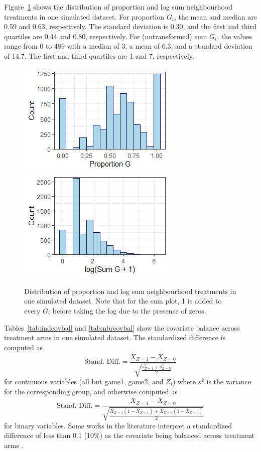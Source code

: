 \documentclass[10pt]{article}
\begin{document}
Figure~\ref{fig:neighbourhood} shows the distribution of proportion and log sum neighbourhood treatments in one simulated dataset. For proportion $G_i$, the mean and median are 0.59 and 0.63, respectively. The standard deviation is 0.30, and the first and third quartiles are 0.44 and 0.80, respectively. For (untransformed) sum $G_i$, the values range from 0 to 489 with a median of 3, a mean of 6.3, and a standard deviation of 14.7. The first and third quartiles are 1 and 7, respectively.

\begin{figure}[H]
\centering
\includegraphics{Images/prop_g_dist.png}
\includegraphics[trim={0.6cm 0 0 0},clip]{Images/sum_g_dist.png}
\caption{Distribution of proportion and log sum neighbourhood treatments in one simulated dataset. Note that for the sum plot, 1 is added to every $G_i$ before taking the log due to the presence of zeros.}
\label{fig:neighbourhood}
\end{figure}

Tables~\ref{tab:indcovbal} and \ref{tab:nbrcovbal} show the covariate balance across treatment arms in one simulated dataset. The standardized difference \parencite{Austin:2011} is computed as
\[
\text{Stand. Diff.} = \frac{\bar{X}_{Z=1} - \bar{X}_{Z=0}}{\sqrt{\frac{s^2_{Z=1}+s^2_{Z=0}}{2}}}
\]
for continuous variables (all but game1, game2, and $Z_i$) where $s^2$ is the variance for the corresponding group, and otherwise computed as
\[
\text{Stand. Diff.} = \frac{\bar{X}_{Z=1} - \bar{X}_{Z=0}}{\sqrt{\frac{\bar{X}_{Z=1}(1-\bar{X}_{Z=1})+\bar{X}_{Z=0}(1-\bar{X}_{Z=0})}{2}}}
\]
for binary variables. Some works in the literature interpret a standardized difference of less than 0.1 (10\%) as the covariate being balanced across treatment arms \parencite{Normand:2001}.
\end{document}

